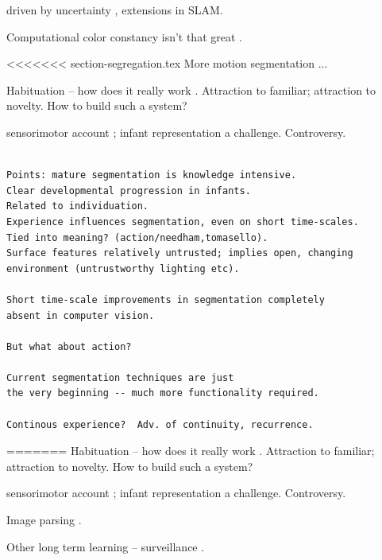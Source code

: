 driven by uncertainty \cite{whaite97autonomous}, 
extensions in SLAM.

Computational color constancy isn't that great
\cite{barnard02comparison}.

<<<<<<< section-segregation.tex
More motion segmentation \cite{smith04layered}...

Habituation -- how does it really work \cite{sirois02models}.
Attraction to familiar; attraction to novelty.
How to build such a system?

sensorimotor account \cite{oregan01sensorimotor};
infant representation a challenge.  Controversy.



\begin{verbatim}

Points: mature segmentation is knowledge intensive.
Clear developmental progression in infants.
Related to individuation.
Experience influences segmentation, even on short time-scales.
Tied into meaning? (action/needham,tomasello).
Surface features relatively untrusted; implies open, changing 
environment (untrustworthy lighting etc).

Short time-scale improvements in segmentation completely
absent in computer vision.

But what about action?

Current segmentation techniques are just
the very beginning -- much more functionality required.

Continous experience?  Adv. of continuity, recurrence.

\end{verbatim}


=======
Habituation -- how does it really work \cite{sirois02models}.
Attraction to familiar; attraction to novelty.
How to build such a system?

sensorimotor account \cite{oregan01sensorimotor};
infant representation a challenge.  Controversy.

Image parsing \cite{tu05image}.

Other long term learning -- surveillance \cite{stauffer00learning}.

